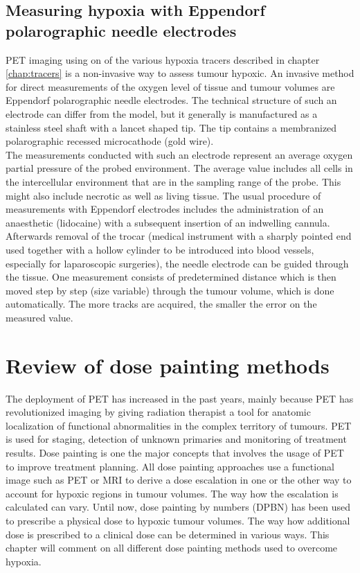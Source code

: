 \subsection[Eppendorf polarographic needle electrodes]{Measuring hypoxia with Eppendorf polarographic needle electrodes}\label{chap:eppendorf}
PET imaging using on of the various hypoxia tracers described in chapter \ref{chap:tracers} is a non-invasive way to assess tumour hypoxic. An invasive method for direct measurements of the oxygen level of tissue and tumour volumes are Eppendorf polarographic needle electrodes. The technical structure of such an electrode can differ from the model, but it generally is manufactured as a stainless steel shaft with a lancet shaped tip. The tip contains a membranized polarographic recessed microcathode (gold wire).\\The measurements conducted with such an electrode represent an average oxygen partial pressure of the probed environment. The average value includes all cells in the intercellular environment that are in the sampling range of the probe. This might also include necrotic as well as living tissue. The usual procedure of measurements with Eppendorf electrodes includes the administration of an anaesthetic (lidocaine) with a subsequent insertion of an indwelling cannula. Afterwards removal of the trocar (medical instrument with a sharply pointed end used together with a hollow cylinder to be introduced into blood vessels, especially for laparoscopic surgeries), the needle electrode can be guided through the tissue. One measurement consists of predetermined distance which is then moved step by step (size variable) through the tumour volume, which is done automatically. The more tracks are acquired, the smaller the error on the measured value. 
\section{Review of dose painting methods}
The deployment of PET has increased in the past years, mainly because PET has revolutionized imaging by giving radiation therapist a tool for anatomic localization of functional abnormalities in the complex territory of tumours. PET is used for staging, detection of unknown primaries and monitoring of treatment results. Dose painting is one the major concepts that involves the usage of PET to improve treatment planning. All dose painting approaches use a functional image such as PET or MRI to derive a dose escalation in one or the other way to account for hypoxic regions in tumour volumes. The way how the escalation is calculated can vary. Until now, dose painting by numbers (DPBN) has been used to prescribe a physical dose to hypoxic tumour volumes. The way how additional dose is prescribed to a clinical dose can be determined in various ways. This chapter will comment on all different dose painting methods used to overcome hypoxia.
